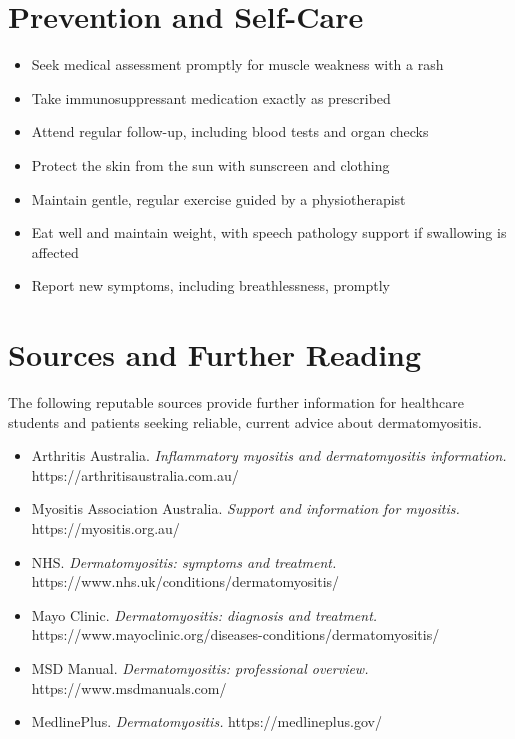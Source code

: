 \section*{Prevention and Self-Care}
\begin{itemize}
    \item Seek medical assessment promptly for muscle weakness with a rash
    \item Take immunosuppressant medication exactly as prescribed
    \item Attend regular follow-up, including blood tests and organ checks
    \item Protect the skin from the sun with sunscreen and clothing
    \item Maintain gentle, regular exercise guided by a physiotherapist
    \item Eat well and maintain weight, with speech pathology support if swallowing is affected
    \item Report new symptoms, including breathlessness, promptly
\end{itemize}

\section*{Sources and Further Reading}
The following reputable sources provide further information for healthcare students and patients seeking reliable, current advice about dermatomyositis.

\begin{itemize}
    \item Arthritis Australia. \textit{Inflammatory myositis and dermatomyositis information.} https://arthritisaustralia.com.au/
    \item Myositis Association Australia. \textit{Support and information for myositis.} https://myositis.org.au/
    \item NHS. \textit{Dermatomyositis: symptoms and treatment.} https://www.nhs.uk/conditions/dermatomyositis/
    \item Mayo Clinic. \textit{Dermatomyositis: diagnosis and treatment.} https://www.mayoclinic.org/diseases-conditions/dermatomyositis/
    \item MSD Manual. \textit{Dermatomyositis: professional overview.} https://www.msdmanuals.com/
    \item MedlinePlus. \textit{Dermatomyositis.} https://medlineplus.gov/
\end{itemize}

